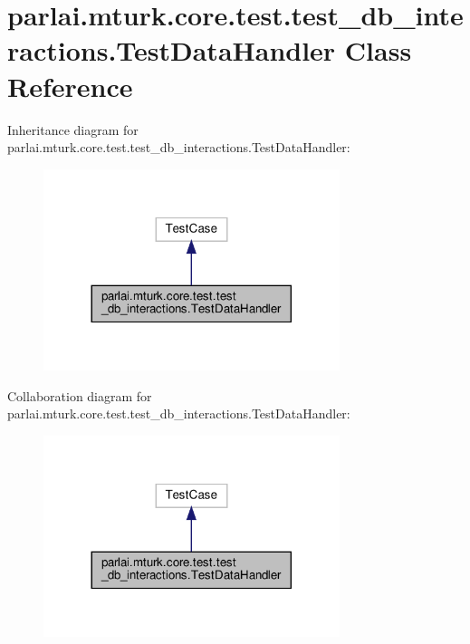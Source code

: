 \hypertarget{classparlai_1_1mturk_1_1core_1_1test_1_1test__db__interactions_1_1TestDataHandler}{}\section{parlai.\+mturk.\+core.\+test.\+test\+\_\+db\+\_\+interactions.\+Test\+Data\+Handler Class Reference}
\label{classparlai_1_1mturk_1_1core_1_1test_1_1test__db__interactions_1_1TestDataHandler}


Inheritance diagram for parlai.\+mturk.\+core.\+test.\+test\+\_\+db\+\_\+interactions.\+Test\+Data\+Handler\+:
\nopagebreak
\begin{figure}[H]
\begin{center}
\leavevmode
\includegraphics[width=245pt]{d4/d97/classparlai_1_1mturk_1_1core_1_1test_1_1test__db__interactions_1_1TestDataHandler__inherit__graph}
\end{center}
\end{figure}


Collaboration diagram for parlai.\+mturk.\+core.\+test.\+test\+\_\+db\+\_\+interactions.\+Test\+Data\+Handler\+:
\nopagebreak
\begin{figure}[H]
\begin{center}
\leavevmode
\includegraphics[width=245pt]{d4/d22/classparlai_1_1mturk_1_1core_1_1test_1_1test__db__interactions_1_1TestDataHandler__coll__graph}
\end{center}
\end{figure}
